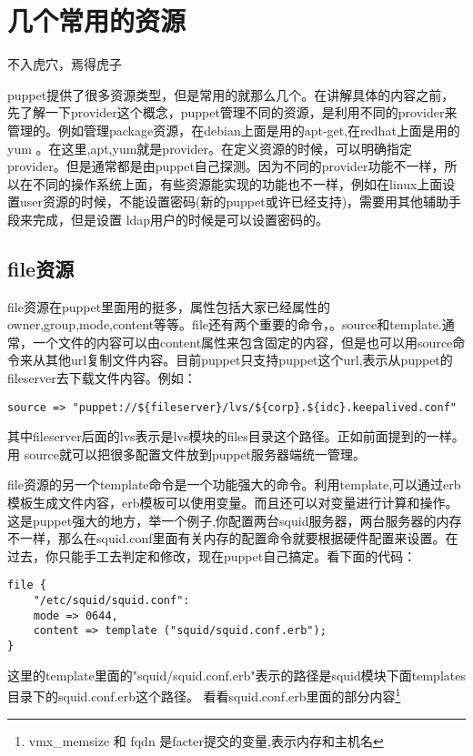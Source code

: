 \chapter{\msyh 几个常用的资源}
\begin{center}
\kai
不入虎穴，焉得虎子
\end{center}
\par
puppet提供了很多资源类型，但是常用的就那么几个。在讲解具体的内容之前，先了解一下provider这个概念，puppet管理不同的资源，是利用不同的provider来管理的。例如管理package资源，在debian上面是用的apt-get,在redhat上面是用的yum 。在这里,apt,yum就是provider。在定义资源的时候，可以明确指定provider。但是通常都是由puppet自己探测。因为不同的provider功能不一样，所以在不同的操作系统上面，有些资源能实现的功能也不一样，例如在linux上面设置user资源的时候，不能设置密码(新的puppet或许已经支持)，需要用其他辅助手段来完成，但是设置 ldap用户的时候是可以设置密码的。
\section{\msyh file资源}
file资源在puppet里面用的挺多，属性包括大家已经属性的owner,group,mode,content等等。file还有两个重要的命令，。source和template.通常，一个文件的内容可以由content属性来包含固定的内容，但是也可以用source命令来从其他url复制文件内容。目前puppet只支持puppet这个url,表示从puppet的fileserver去下载文件内容。例如：
\msyh \begin{lstlisting}
source => "puppet://${fileserver}/lvs/${corp}.${idc}.keepalived.conf"
\end{lstlisting} \song
其中fileserver后面的lvs表示是lvs模块的files目录这个路径。正如前面提到的一样。用 source就可以把很多配置文件放到puppet服务器端统一管理。

file资源的另一个template命令是一个功能强大的命令。利用template,可以通过erb模板生成文件内容，erb模板可以使用变量。而且还可以对变量进行计算和操作。这是puppet强大的地方，举一个例子,你配置两台squid服务器，两台服务器的内存不一样，那么在squid.conf里面有关内存的配置命令就要根据硬件配置来设置。在过去，你只能手工去判定和修改，现在puppet自己搞定。看下面的代码：
\newpage
\msyh \begin{lstlisting}
file {
	"/etc/squid/squid.conf":
	mode => 0644,
	content => template ("squid/squid.conf.erb");
}
\end{lstlisting} \song

这里的template里面的"squid/squid.conf.erb"表示的路径是squid模块下面templates目录下的squid.conf.erb这个路径。
看看squid.conf.erb里面的部分内容\footnote{\fsong\tiny vmx\_memsize 和 fqdn 是facter提交的变量,表示内存和主机名}

